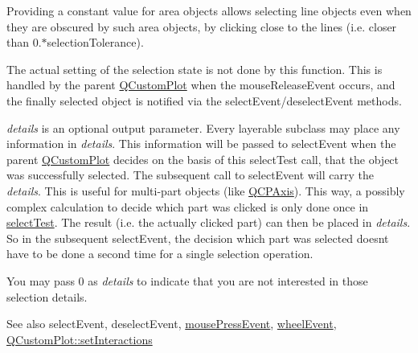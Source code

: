 Providing a constant value for area objects allows selecting line objects even when they are obscured by such area objects, by clicking close to the lines (i.\+e. closer than 0.$\ast$selection\+Tolerance).

The actual setting of the selection state is not done by this function. This is handled by the parent \hyperlink{class_q_custom_plot}{Q\+Custom\+Plot} when the mouse\+Release\+Event occurs, and the finally selected object is notified via the select\+Event/deselect\+Event methods.

{\itshape details} is an optional output parameter. Every layerable subclass may place any information in {\itshape details}. This information will be passed to select\+Event when the parent \hyperlink{class_q_custom_plot}{Q\+Custom\+Plot} decides on the basis of this select\+Test call, that the object was successfully selected. The subsequent call to select\+Event will carry the {\itshape details}. This is useful for multi-\/part objects (like \hyperlink{class_q_c_p_axis}{Q\+C\+P\+Axis}). This way, a possibly complex calculation to decide which part was clicked is only done once in \hyperlink{class_q_c_p_layerable_a4001c4d0dfec55598efa4d531f2179a9}{select\+Test}. The result (i.\+e. the actually clicked part) can then be placed in {\itshape details}. So in the subsequent select\+Event, the decision which part was selected doesn\textquotesingle{}t have to be done a second time for a single selection operation.

You may pass 0 as {\itshape details} to indicate that you are not interested in those selection details.

\begin{DoxySeeAlso}{See also}
select\+Event, deselect\+Event, \hyperlink{class_q_c_p_layerable_af6567604818db90f4fd52822f8bc8376}{mouse\+Press\+Event}, \hyperlink{class_q_c_p_layerable_a47dfd7b8fd99c08ca54e09c362b6f022}{wheel\+Event}, \hyperlink{class_q_custom_plot_a5ee1e2f6ae27419deca53e75907c27e5}{Q\+Custom\+Plot\+::set\+Interactions} 
\end{DoxySeeAlso}


